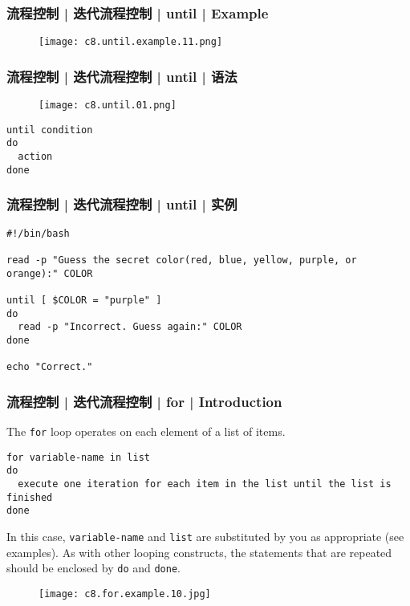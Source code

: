 \begin{frame}
  \frametitle{流程控制 | 迭代流程控制 | until | Example}
  \begin{figure}
    \centering
    \texttt{[image: c8.until.example.11.png]}
  \end{figure}
\end{frame}

\begin{frame}[fragile]
  \frametitle{流程控制 | 迭代流程控制 | until | \alert{语法}}
  \begin{figure}
    \centering
    \texttt{[image: c8.until.01.png]}
  \end{figure}
\begin{lstlisting}
until condition
do
  action
done
\end{lstlisting}
\end{frame}

\begin{frame}[fragile]
  \frametitle{流程控制 | 迭代流程控制 | until | \alert{实例}}
\begin{lstlisting}
#!/bin/bash

read -p "Guess the secret color(red, blue, yellow, purple, or orange):" COLOR 

until [ $COLOR = "purple" ]
do
  read -p "Incorrect. Guess again:" COLOR
done

echo "Correct."
\end{lstlisting}
\end{frame}

\begin{frame}[fragile]
  \frametitle{流程控制 | 迭代流程控制 | for | Introduction}
  The \verb|for| loop operates on each element of a list of items.
  \vspace{-0.2cm}
\begin{lstlisting}
for variable-name in list
do
  execute one iteration for each item in the list until the list is finished
done
\end{lstlisting}
  \vspace{-0.1cm}
  In this case, \verb|variable-name| and \verb|list| are substituted by you as appropriate (see examples). As with other looping constructs, the statements that are repeated should be enclosed by \verb|do| and \verb|done|.
  \vspace{-0.2cm}
  \begin{figure}
    \centering
    \texttt{[image: c8.for.example.10.jpg]}
  \end{figure}
\end{frame}

